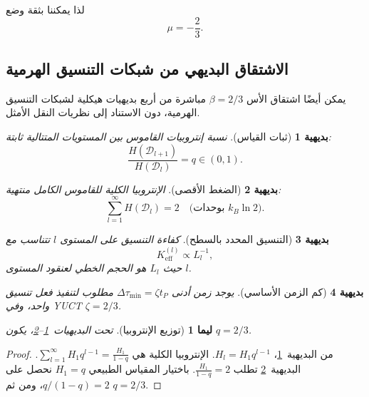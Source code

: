 \documentclass[11pt,a4paper]{article}
\newtheorem{lemma}{ليما}[section]
\newtheorem{axiom}{بديهية}[section]
\begin{document}
	لذا يمكننا بثقة وضع
	\[
	\mu = -\frac{2}{3}. \label{eq:mu}
	\]
	
	\subsection{الاشتقاق البديهي من شبكات التنسيق الهرمية}
	\label{subsec:axiomatic-beta}
	
	يمكن أيضًا اشتقاق الأس \(\beta = 2/3\) مباشرة من أربع بديهيات هيكلية لشبكات التنسيق الهرمية، دون الاستناد إلى نظريات النقل الأمثل.
	
	\begin{axiom}[ثبات القياس]
		\label{ax:A1}
		نسبة إنتروبيات القاموس بين المستويات المتتالية ثابتة:
		\[
		\frac{H(\mathcal{D}_{l+1})}{H(\mathcal{D}_l)} = q \in (0,1).
		\]
	\end{axiom}
	
	\begin{axiom}[الضغط الأقصى]
		\label{ax:A2}
		الإنتروبيا الكلية للقاموس الكامل منتهية:
		\[
		\sum_{l=1}^{\infty} H(\mathcal{D}_l) = 2 \quad \text{(بوحدات } k_B\ln 2\text{)}.
		\]
	\end{axiom}
	
	\begin{axiom}[التنسيق المحدد بالسطح]
		\label{ax:A3}
		كفاءة التنسيق على المستوى \(l\) تتناسب مع
		\[
		K_{\mathrm{eff}}^{(l)} \propto L_l^{-1},
		\]
		حيث \(L_l\) هو الحجم الخطي لعنقود المستوى \(l\).
	\end{axiom}
	
	\begin{axiom}[كم الزمن الأساسي]
		\label{ax:A4}
		يوجد زمن أدنى \(\Delta\tau_{\min} = \zeta t_P\) مطلوب لتنفيذ فعل تنسيق واحد، وفي YUCT \(\zeta = 2/3\).
	\end{axiom}
	
	\begin{lemma}[توزيع الإنتروبيا]
		\label{lem:entropy}
		تحت البديهيات~\ref{ax:A1}--\ref{ax:A2}، يكون \(q = 2/3\).
	\end{lemma}
	\begin{proof}
		من البديهية~\ref{ax:A1}، \(H_l = H_1 q^{l-1}\). الإنتروبيا الكلية هي \(\sum_{l=1}^{\infty} H_1 q^{l-1} = \frac{H_1}{1-q}\). البديهية~\ref{ax:A2} تطلب \(\frac{H_1}{1-q}=2\). باختيار المقياس الطبيعي \(H_1 = q\) نحصل على \(q/(1-q) = 2\)، ومن ثم \(q = 2/3\).
	\end{proof}
	
\end{document}
